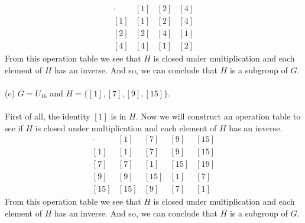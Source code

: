 \documentclass[11pt,a4paper]{article}
\begin{document}
\[
\begin{array}{c|c|c|c}
\cdot & [1] & [2] & [4]\\\hline
[1] & [1] & [2] & [4]\\\hline
[2] & [2] & [4] & [1]\\\hline
[4] & [4] & [1] & [2]
\end{array}
\]
From this operation table we see that $H$ is closed under multiplication and each element of $H$ has an inverse. And so, we can conclude that $H$ is a subgroup of $G$.\\
~\\
(c) $G=U_{16}$ and $H=\{[1],[7],[9],[15]\}$.\\
~\\
First of all, the identity $[1]$ is in $H$. Now we will construct an operation table to see if $H$ is closed under multiplication and each element of $H$ has an inverse.
\[
\begin{array}{c|c|c|c|c}
\cdot & [1] & [7] & [9] & [15] \\\hline
[1] & [1] & [7] & [9] & [15]\\ \hline
[7] & [7] & [1] & [15] & [19] \\ \hline
[9] & [9] & [15] & [1] & [7] \\ \hline
[15] & [15] & [9] & [7] & [1]
\end{array} 
\]
From this operation table we see that $H$ is closed under multiplication and each element of $H$ has an inverse. And so, we can conclude that $H$ is a subgroup of $G$.\\
\end{document}
